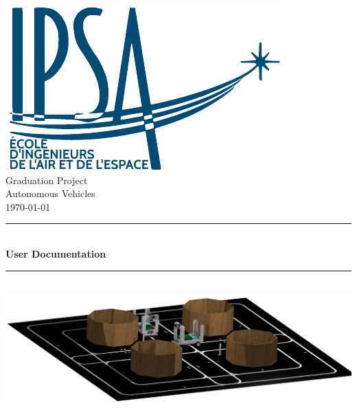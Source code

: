 
\begin{titlepage}

\newcommand{\HRule}{\rule{\linewidth}{0.5mm}} %

\center %
 

\includegraphics[scale=0.7]{Graphics/LOGO-IPSA.pdf}\\[2cm]

\Large Graduation Project \\[0.2cm] %
\large Autonomous Vehicles\\[2cm] %

{\normalsize \today}\\[2cm]


\HRule \\[0.5cm]
{ \Large \bfseries User Documentation}\\[0.2cm] %
\HRule \\[2.5cm]



 \includegraphics[scale=0.09]{Graphics/illu.png}\\[2.5cm]


\end{titlepage}
